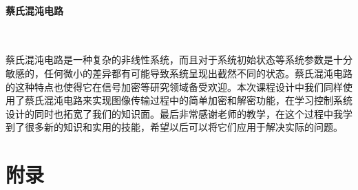 \documentclass[UTF8]{article}
\begin{document}
\paragraph{蔡氏混沌电路}~{}

蔡氏混沌电路是一种复杂的非线性系统，而且对于系统初始状态等系统参数是十分敏感的，任何微小的差异都有可能导致系统呈现出截然不同的状态。蔡氏混沌电路的这种特点也使得它在信号加密等研究领域备受欢迎。本次课程设计中我们同样使用了蔡氏混沌电路来实现图像传输过程中的简单加密和解密功能，在学习控制系统设计的同时也拓宽了我们的知识面。最后非常感谢老师的教学，在这个过程中我学到了很多新的知识和实用的技能，希望以后可以将它们应用于解决实际的问题。



\newpage
%
\section{附录}
%
\end{document}
